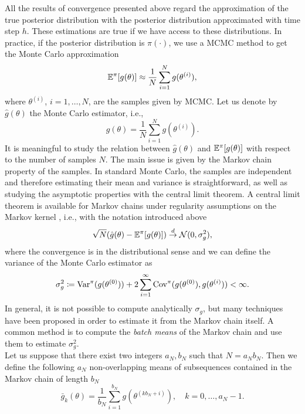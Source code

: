 All the results of convergence presented above regard the approximation of the true posterior distribution with the posterior distribution approximated with time step $h$. These estimations are true if we have access to these distributions. In practice, if the posterior distribution is $\pi(\cdot)$, we use a MCMC method to get the Monte Carlo approximation
\begin{equation}
	\mathbb{E}^\pi[g(\theta)] \approx \frac{1}{N} \sum_{i = 1}^{N} g(\theta^{(i)}),
\end{equation}
where $\theta^{(i)}$, $i = 1, \ldots, N$, are the samples given by MCMC. Let us denote by $\hat g(\theta)$ the Monte Carlo estimator, i.e.,
\begin{equation}
	\hat g(\theta) = \frac{1}{N} \sum_{i = 1}^{N} g(\theta^{(i)}).
\end{equation} 
It is meaningful to study the relation between $\hat g(\theta)$ and $\mathbb{E}^\pi[g(\theta)]$ with respect to the number of samples $N$. The main issue is given by the Markov chain property of the samples. In standard Monte Carlo, the samples are independent and therefore estimating their mean and variance is straightforward, as well as studying the asymptotic properties with the central limit theorem. A central limit theorem is available for Markov chains under regularity assumptions on the Markov kernel \cite{Jon04}, i.e., with the notation introduced above
\begin{equation}\label{eq:CLTMarkov}
	\sqrt{N}(\hat g(\theta) - \mathbb{E}^\pi[g(\theta)]) \stackrel{d}{\to} \mathcal{N}(0, \sigma^2_g),
\end{equation}
where the convergence is in the distributional sense and we can define the variance of the Monte Carlo estimator as
\begin{equation}
\sigma^2_g \coloneqq \operatorname{Var}^\pi(g(\theta^{(0)})) + 2\sum_{i = 1}^{\infty} \mathrm{Cov}^\pi(g(\theta^{(0)}), g(\theta^{(i)})) < \infty.
\end{equation}
In general, it is not possible to compute analytically $\sigma_g$, but many techniques have been proposed in order to estimate it from the Markov chain itself. A common method \cite{FlJ10} is to compute the \textit{batch means} of the Markov chain and use them to estimate $\sigma^2_g$. \\
Let us suppose that there exist two integers $a_N, b_N$ such that $N = a_Nb_N$. Then we define the following $a_N$ non-overlapping means of subsequences contained in the Markov chain of length $b_N$
\begin{equation}
	\bar g_k(\theta) = \frac{1}{b_N} \sum_{i=1}^{b_N} g(\theta^{(kb_N + i)}), \quad k = 0, \ldots, a_N - 1. 
\end{equation} 
